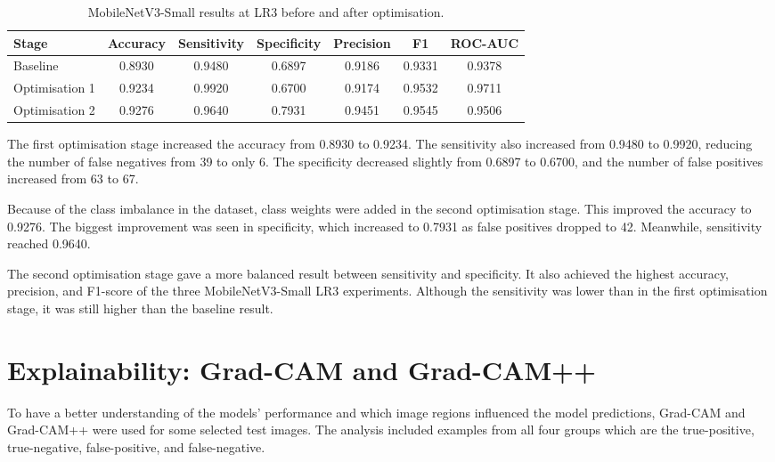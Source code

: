 \begin{table}[htbp]
    \centering
    \caption{MobileNetV3-Small results at LR3 before and after optimisation.}
    \label{tab:mobilenet_lr3_optimisation}

    \small
    \setlength{\tabcolsep}{4pt}

    \begin{tabular}{|l|c|c|c|c|c|c|}
        \hline
        \textbf{Stage} & \textbf{Accuracy} & \textbf{Sensitivity} &
        \textbf{Specificity} & \textbf{Precision} & \textbf{F1} &
        \textbf{ROC-AUC} \\ \hline
        Baseline & 0.8930 & 0.9480 & 0.6897 & 0.9186 & 0.9331 & 0.9378 \\ \hline
        Optimisation 1 & 0.9234 & 0.9920 & 0.6700 & 0.9174 & 0.9532 & 0.9711 \\ \hline
        Optimisation 2 & 0.9276 & 0.9640 & 0.7931 & 0.9451 & 0.9545 & 0.9506 \\ \hline
    \end{tabular}
\end{table}

\FloatBarrier

The first optimisation stage increased the accuracy from 0.8930 to 0.9234. The sensitivity also increased from 0.9480 to 0.9920, reducing the number of false negatives from 39 to only 6. The specificity decreased slightly from 0.6897 to 0.6700, and the number of false positives increased from 63 to 67.

Because of the class imbalance in the dataset, class weights were added in the second optimisation stage. This improved the accuracy to 0.9276. The biggest improvement was seen in specificity, which increased to 0.7931 as false positives dropped to 42. Meanwhile, sensitivity reached 0.9640.

The second optimisation stage gave a more balanced result between sensitivity and specificity. It also achieved the highest accuracy, precision, and F1-score of the three MobileNetV3-Small LR3 experiments. Although the sensitivity was lower than in the first optimisation stage, it was still higher than the baseline result.

\section{Explainability: Grad-CAM and Grad-CAM++}

To have a better understanding of the models' performance and which image regions influenced the model predictions, Grad-CAM and Grad-CAM++ were used for some selected test images. The analysis included examples from all four groups which are the true-positive, true-negative, false-positive, and false-negative.

